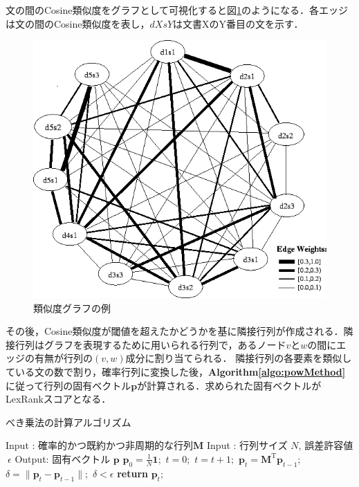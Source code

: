 文の間のCosine類似度をグラフとして可視化すると図\ref{Fig:lexGraph1}のようになる．各エッジは文の間のCosine類似度を表し，$dXsY$は文書XのY番目の文を示す．
\begin{figure}[htbp]
 \begin{center}
  \includegraphics[width=\textwidth]{../images/2.Related_Work/lexRank-graph.png}
  \caption{類似度グラフの例}
  \label{Fig:lexGraph1}
  \vspace{-10pt}
 \end{center}
\end{figure}

その後，Cosine類似度が閾値を超えたかどうかを基に隣接行列が作成される．隣接行列はグラフを表現するために用いられる行列で，あるノード$v$と$w$の間にエッジの有無が行列の$(v,w)$成分に割り当てられる．
隣接行列の各要素を類似している文の数で割り，確率行列に変換した後，\textbf{Algorithm\ref{algo:powMethod}}に従って行列の固有ベクトル$\bm{p}$が計算される．求められた固有ベクトルがLexRankスコアとなる．
\begin{algorithm}
\caption{べき乗法の計算アルゴリズム} \label{algo:powMethod}
\begin{algorithmic}[1]
\State Input : 確率的かつ既約かつ非周期的な行列$\bm{M}$
\State Input : 行列サイズ $N$, 誤差許容値$~ \epsilon$
\State Output: 固有ベクトル $\bm{p}$
	\State $\bm{p}_{0}=  \frac{1}{N} \bm{1};$
	\State $t=0;$
	\Repeat
		\State $t=t+1;$
		\State $\bm{p}_{t} = \bm{M}^{\mathrm{T}} \bm{p}_{t-1};$
		\State $\delta = \| \bm{p}_{t} - \bm{p}_{t-1} \| ;$
	\Until $ \delta < \epsilon$
	\State \textbf{return} $\bm{p}_{t};$
\EndProcedure
\end{algorithmic}
\end{algorithm}

